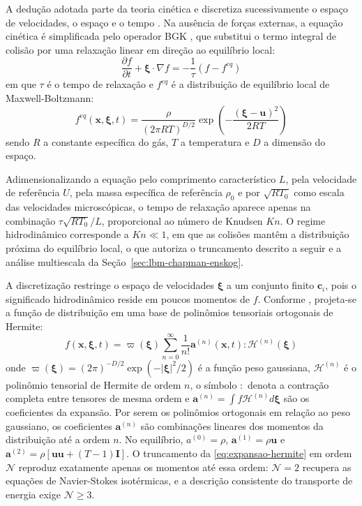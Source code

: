 A dedução adotada parte da teoria cinética e discretiza sucessivamente o espaço de velocidades, o espaço e o tempo \parencite{Chen1998}.
Na ausência de forças externas, a equação cinética é simplificada pelo operador BGK \parencite{Bhatnagar1954}, que substitui o termo integral de colisão por uma relaxação linear em direção ao equilíbrio local:
\begin{equation}
    \frac{\partial f}{\partial t} + \boldsymbol{\xi} \cdot \nabla f = -\frac{1}{\tau}(f - f^{eq})
\end{equation}
em que $\tau$ é o tempo de relaxação e $f^{eq}$ é a distribuição de equilíbrio local de Maxwell-Boltzmann:
\begin{equation}
    f^{eq}(\mathbf{x}, \boldsymbol{\xi}, t) = \frac{\rho}{(2\pi RT)^{D/2}} \exp\left( -\frac{(\boldsymbol{\xi} - \mathbf{u})^2}{2RT} \right)
\end{equation}
sendo $R$ a constante específica do gás, $T$ a temperatura e $D$ a dimensão do espaço.

Adimensionalizando a equação pelo comprimento característico $L$, pela velocidade de referência $U$, pela massa específica de referência $\rho_0$ e por $\sqrt{RT_0}$ como escala das velocidades microscópicas, o tempo de relaxação aparece apenas na combinação $\tau \sqrt{RT_0}/L$, proporcional ao número de Knudsen $Kn$.
O regime hidrodinâmico corresponde a $Kn \ll 1$, em que as colisões mantêm a distribuição próxima do equilíbrio local, o que autoriza o truncamento descrito a seguir e a análise multiescala da Seção~\ref{sec:lbm-chapman-enskog}.

A discretização restringe o espaço de velocidades $\boldsymbol{\xi}$ a um conjunto finito $\mathbf{c}_i$, pois o significado hidrodinâmico reside em poucos momentos de $f$.
Conforme \textcite{Shan2006}, projeta-se a função de distribuição em uma base de polinômios tensoriais ortogonais de Hermite:
\begin{equation}\label{eq:expansao-hermite}
    f(\mathbf{x}, \boldsymbol{\xi}, t) = \varpi(\boldsymbol{\xi}) \sum_{n=0}^{\infty} \frac{1}{n!} \mathbf{a}^{(n)}(\mathbf{x}, t) : \boldsymbol{\mathcal{H}}^{(n)}(\boldsymbol{\xi})
\end{equation}
onde $\varpi(\boldsymbol{\xi}) = (2\pi)^{-D/2} \exp(-|\boldsymbol{\xi}|^2/2)$ é a função peso gaussiana, $\boldsymbol{\mathcal{H}}^{(n)}$ é o polinômio tensorial de Hermite de ordem $n$, o símbolo $:$ denota a contração completa entre tensores de mesma ordem e $\mathbf{a}^{(n)} = \int f \boldsymbol{\mathcal{H}}^{(n)} d\boldsymbol{\xi}$ são os coeficientes da expansão.
Por serem os polinômios ortogonais em relação ao peso gaussiano, os coeficientes $\mathbf{a}^{(n)}$ são combinações lineares dos momentos da distribuição até a ordem $n$.
No equilíbrio, $a^{(0)} = \rho$, $\mathbf{a}^{(1)} = \rho \mathbf{u}$ e $\mathbf{a}^{(2)} = \rho \left[ \mathbf{u}\mathbf{u} + (T - 1)\mathbf{I} \right]$.
O truncamento da \eqref{eq:expansao-hermite} em ordem $\mathcal{N}$ reproduz exatamente apenas os momentos até essa ordem: $\mathcal{N} = 2$ recupera as equações de Navier-Stokes isotérmicas, e a descrição consistente do transporte de energia exige $\mathcal{N} \ge 3$.

